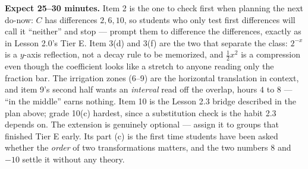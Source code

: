 \documentclass[10pt]{article}
\begin{document}
\boxguard[18]
\begin{teachernote}[Homework]
    \textbf{Expect 25--30 minutes.} Item 2 is the one to check first when planning the next do-now:
    $C$ has differences $2,6,10$, so students who only test first differences will call it
    ``neither'' and stop --- prompt them to difference the differences, exactly as in Lesson 2.0's
    Tier E. Item 3(d) and 3(f) are the two that separate the class: $2^{-x}$ is a $y$-axis
    reflection, not a decay rule to be memorized, and $\tfrac12 x^2$ is a compression even though
    the coefficient looks like a stretch to anyone reading only the fraction bar. The irrigation
    zones (6--9) are the horizontal translation in context, and item 9's second half wants an
    \emph{interval} read off the overlap, hours $4$ to $8$ --- ``in the middle'' earns nothing.
    Item 10 is the Lesson 2.3 bridge described in the plan above; grade 10(c) hardest, since a
    substitution check is the habit 2.3 depends on. The extension is genuinely optional --- assign
    it to groups that finished Tier E early. Its part (c) is the first time students have been
    asked whether the \emph{order} of two transformations matters, and the two numbers $8$ and
    $-10$ settle it without any theory.
\end{teachernote}
\end{document}
